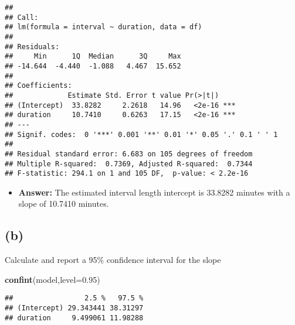 \documentclass[]{article}
\newenvironment{Shaded}{\begin{snugshade}}{\end{snugshade}}
\newcommand{\KeywordTok}[1]{\textcolor[rgb]{0.13,0.29,0.53}{\textbf{#1}}}
\newcommand{\DataTypeTok}[1]{\textcolor[rgb]{0.13,0.29,0.53}{#1}}
\newcommand{\FloatTok}[1]{\textcolor[rgb]{0.00,0.00,0.81}{#1}}
\newcommand{\OperatorTok}[1]{\textcolor[rgb]{0.81,0.36,0.00}{\textbf{#1}}}
\newcommand{\NormalTok}[1]{#1}
\providecommand{\tightlist}{%
  \setlength{\itemsep}{0pt}\setlength{\parskip}{0pt}}
\begin{document}
\begin{Shaded}
\end{Shaded}

\begin{verbatim}
## 
## Call:
## lm(formula = interval ~ duration, data = df)
## 
## Residuals:
##     Min      1Q  Median      3Q     Max 
## -14.644  -4.440  -1.088   4.467  15.652 
## 
## Coefficients:
##             Estimate Std. Error t value Pr(>|t|)    
## (Intercept)  33.8282     2.2618   14.96   <2e-16 ***
## duration     10.7410     0.6263   17.15   <2e-16 ***
## ---
## Signif. codes:  0 '***' 0.001 '**' 0.01 '*' 0.05 '.' 0.1 ' ' 1
## 
## Residual standard error: 6.683 on 105 degrees of freedom
## Multiple R-squared:  0.7369, Adjusted R-squared:  0.7344 
## F-statistic: 294.1 on 1 and 105 DF,  p-value: < 2.2e-16
\end{verbatim}

\begin{itemize}
\tightlist
\item
  \textbf{Answer:} The estimated interval length intercept is 33.8282
  minutes with a slope of 10.7410 minutes.
\end{itemize}

\subsection{(b)}\label{b-1}

Calculate and report a 95\% confidence interval for the slope

\begin{Shaded}
\begin{Highlighting}[]
\KeywordTok{confint}\NormalTok{(model,}\DataTypeTok{level=}\FloatTok{0.95}\NormalTok{)}
\end{Highlighting}
\end{Shaded}

\begin{verbatim}
##                 2.5 %   97.5 %
## (Intercept) 29.343441 38.31297
## duration     9.499061 11.98288
\end{verbatim}
\end{document}
